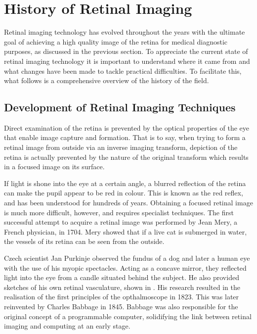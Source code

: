 
\chapter{History of Retinal Imaging}

\label{history_retinal_imaging}

Retinal imaging technology has evolved throughout the years with the ultimate
goal of achieving a high quality image of the retina for medical diagnostic
purposes, as discussed in the previous section.  To appreciate the current
state of retinal imaging technology it is important to understand where it
came from and what changes have been made to tackle practical difficulties.
To facilitate this, what follows is a comprehensive overview of the history of
the field.

\section{Development of Retinal Imaging Techniques}

Direct examination of the retina is prevented by the optical properties of the
eye that enable image capture and formation.  That is to say, when trying to
form a retinal image from outside via an inverse imaging transform, depiction
of the retina is actually prevented by the nature of the original transform which
results in a focused image on its surface.

If light is shone into the eye at a certain angle, a blurred reflection of the
retina can make the pupil appear to be red in colour.  This is known as
the red reflex, and has been understood for hundreds of years.  Obtaining
a focused retinal image is much more difficult, however, and requires
specialist techniques.  The first successful attempt to acquire a retinal
image was performed by Jean Mery, a French physician, in 1704.
\cite{valsalva1704aure}  Mery showed that if a live cat is submerged in
water, the vessels of its retina can be seen from the outside.
\cite{collegeoptometrists}

Czech scientist Jan Purkinje observed the fundus of a dog and later a
human eye with the use of his myopic spectacles.  Acting as a concave
mirror, they reflected light into the eye from a candle situated behind the
subject.  He also provided sketches of his own retinal vasculature, shown
in .  His research resulted in the realisation of the
first principles of the opthalmoscope in 1823.  This was later reinvented
by Charles Babbage in 1845.\cite{flick1947centenary,keeler1997150}
Babbage was also responsible for the original concept of a programmable
computer, solidifying the link between retinal imaging and computing at an
early stage.\cite{halacy1970charles}

